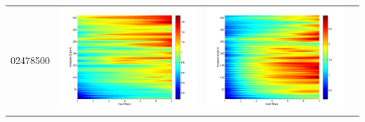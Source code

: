 \documentclass[11pt]{article}
\begin{document}
\begin{table}[H]
{\begin{tabular}{c  c   c   c  }
02478500&\begin{minipage}{.3\textwidth}\includegraphics[width=\linewidth]{resultgraph/02478500p.png}\end{minipage}
&\begin{minipage}{.3\textwidth}\includegraphics[width=\linewidth]{resultgraph/02478500pep.png}\end{minipage}

\end{tabular}}
\end{table}
\end{document}
